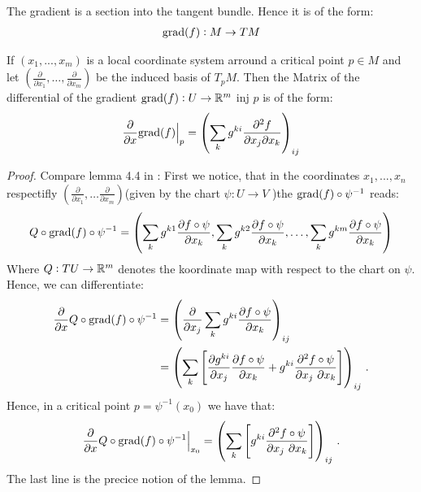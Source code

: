 The gradient is a section into the tangent bundle. Hence it is of the form:
\begin{align*}
    \mathrm{grad}(f):M\to TM
\end{align*}
\begin{lemma}
    If $(x_1,...,x_m)$ is a local coordinate system arround a critical point $p\in M$ and let $\left( \frac{\partial}{\partial x_1},\dots ,\frac{\partial}{\partial x_m}\right)$ be the induced basis of $T_pM$.  Then the Matrix of the differential of the gradient $\mathrm{grad}(f): U \to \mathbb{R}^m$ inj $p$ is of the form:
    \begin{align*}
        \frac{\partial}{\partial x}\mathrm{grad}(f)\Big|_p=\left(\sum_{k} g^{ki}\frac{\partial ^2 f }{\partial x_j \partial x_k} \right)_{ij}
    \end{align*}
\end{lemma}\begin{proof}
    Compare lemma 4.4 in \cite{banyaga2004lectures}: 
    First we notice, that in the coordinates $x_1,...,x_n$ respectifly $(\frac{\partial}{\partial x_1},\dots \frac{\partial}{\partial x_m})$(given by the chart $\psi: U\to V$ )the $\mathrm{grad}(f)\circ \psi^{-1}$ reads:
    \begin{align*}
        Q\circ \mathrm{grad}(f)\circ \psi^{-1}= \left(\sum_k g^{k1}\frac{\partial f \circ \psi}{\partial x_k},\sum_k g^{k2}\frac{\partial f \circ \psi}{\partial x_k},\dots, \sum_k g^{km}\frac{\partial f \circ \psi}{\partial x_k} \right)
    \end{align*} Where $Q:TU\to \mathbb{R}^m$ denotes the koordinate map with respect to the chart on $\psi$. 
    Hence, we can differentiate: 
    \begin{align*}
        \frac{\partial}{\partial x}  Q\circ \mathrm{grad}(f)\circ \psi^{-1}
        &= \left(\frac{\partial}{\partial x_j} \sum_k g^{ki}\frac{\partial f \circ \psi}{\partial x_k}\right)_{ij} \\
        &= \left(\sum_k \left[ 
        \frac{\partial g^{ki}}{\partial x_j}\frac{\partial f \circ \psi}{\partial x_k} +  g^{ki}\frac{\partial^2 f \circ \psi}{\partial x_j ~\partial x_k}
        \right]\right)_{ij} \, .
    \end{align*} Hence, in a critical point $p=\psi^{-1}(x_0)$ we have that:
    \begin{align*}
         \frac{\partial}{\partial x}  Q\circ \mathrm{grad}(f)\circ \psi^{-1} \Big|_{x_0}=\left(\sum_k \left[ 
         g^{ki}\frac{\partial^2 f \circ \psi}{\partial x_j ~\partial x_k}
        \right]\right)_{ij} \, .
    \end{align*} The last line is the precice notion of the lemma.
\end{proof}
